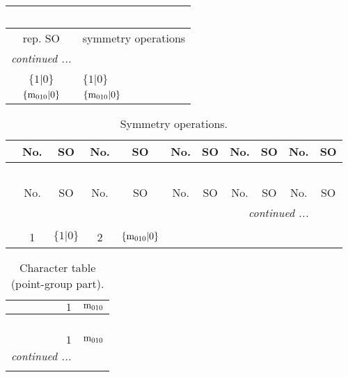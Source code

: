 \documentclass[fleqn,10pt,landscape]{article}
\begin{document}
\begin{itemize}
\begin{center}
\begin{longtable}{c|l}
\multicolumn{1}{l}{\tablename\ \thetable{}} \\
 \hline \hline
rep. SO & symmetry operations \\ \hline \endhead

 \hline \hline
\multicolumn{1}{r}{\footnotesize\it continued ...} \\ \endfoot

 \hline \hline
\multicolumn{1}{r}{} \\ \endlastfoot

$\{1|0\}$ & $\{1|0\}$ \\ \hline
$\{{\rm m}_{010}|0\}$ & $\{{\rm m}_{010}|0\}$ \\
\end{longtable}
\end{center}
\begin{center}
\renewcommand{\arraystretch}{1.3}
\begin{longtable}{c|cc|cc|cc|cc|cc}
\caption{Symmetry operations.}
 \\
 \hline \hline
 & No. & SO & No. & SO & No. & SO & No. & SO & No. & SO \\ \hline \endfirsthead

\multicolumn{10}{l}{\tablename\ \thetable{}} \\
 \hline \hline
 & No. & SO & No. & SO & No. & SO & No. & SO & No. & SO \\ \hline \endhead

 \hline \hline
\multicolumn{10}{r}{\footnotesize\it continued ...} \\ \endfoot

 \hline \hline
\multicolumn{10}{r}{} \\ \endlastfoot

 & 1 & $\{1|0\}$ & 2 & $\{{\rm m}_{010}|0\}$ \\
\end{longtable}
\end{center}
\begin{center}
\renewcommand{\arraystretch}{1.0}
\begin{longtable}{c|rr}
\caption{Character table (point-group part).}
 \\
 \hline \hline
 & $ 1 $ & $ {\rm m}_{010} $ \\ \hline \endfirsthead

\multicolumn{2}{l}{\tablename\ \thetable{}} \\
 \hline \hline
 & $ 1 $ & $ {\rm m}_{010} $ \\ \hline \endhead

 \hline \hline
\multicolumn{2}{r}{\footnotesize\it continued ...} \\ \endfoot


\end{longtable}
\end{center}
\end{itemize}
\end{document}
